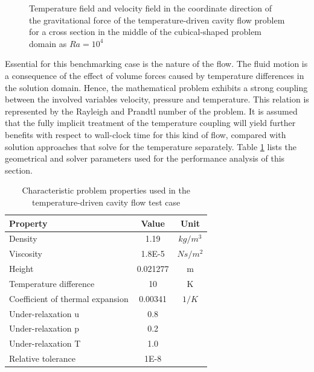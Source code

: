 \begin{figure}[h!]
{\begin{minipage}{0.45\textwidth}
\end{minipage} }
\caption{Temperature field and velocity field in the coordinate direction of the gravitational force of the temperature-driven cavity flow problem for a cross section in the middle of the cubical-shaped problem domain as $Ra = 10^4$ }
  \label{fig:sketchcavity}
\end{figure}

Essential for this benchmarking case is the nature of the flow. The fluid motion is a consequence of the effect of volume forces caused by temperature differences in the solution domain. Hence, the mathematical problem exhibits a strong coupling between the involved variables velocity, pressure and temperature. This relation is represented by the Rayleigh and Prandtl number of the problem. It is assumed that the fully implicit treatment of the temperature coupling will yield further benefits with respect to wall-clock time for this kind of flow, compared with solution approaches that solve for the temperature separately. Table \ref{tab:cavity} lists the geometrical and solver parameters used for the performance analysis of this section.

\begin{table}[h!]\centering
  \caption{Characteristic problem properties used in the temperature-driven cavity flow test case}
  \begin{tabular}{lcc}\toprule
    Property & Value & Unit \\
    \midrule
    \rowcolor{tud0a} Density            & 1.19      & $kg/m^3$  \\
    \rowcolor{black!00} Viscosity          & 1.8E-5    & $Ns/m^2$  \\
    \rowcolor{tud0a} Height             & 0.021277  & m         \\
    \rowcolor{black!00} Temperature difference & 10    & K         \\
    \rowcolor{tud0a} Coefficient of thermal expansion & 0.00341 & $1/K$ \\
    \rowcolor{black!00} Under-relaxation u & 0.8       &           \\
    \rowcolor{tud0a} Under-relaxation p & 0.2       &           \\
    \rowcolor{black!00} Under-relaxation T & 1.0       &           \\
    \rowcolor{tud0a} Relative tolerance & 1E-8      &
  \end{tabular}
  \label{tab:cavity}
\end{table}

